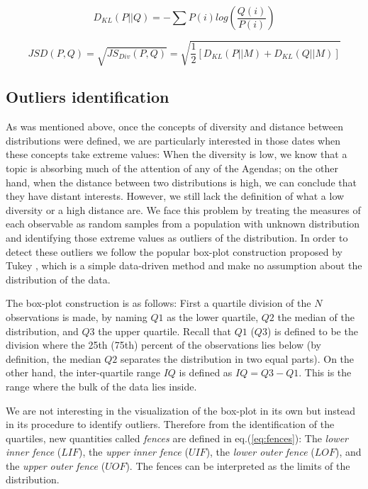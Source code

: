 \documentclass{bmcart}
\begin{document}
\begin{equation}
D_{KL}(P||Q) = -\sum{P(i) log(\frac{Q(i)}{P(i)})}
\label{eq:kl}
\end{equation}

\begin{equation}
\label{eq:jensen_shannon_distance}
JSD(P,Q) = \sqrt{JS_{Div}(P,Q)} = \sqrt{\frac{1}{2}[D_{KL}(P||M) + D_{KL}(Q||M)]} 
\label{eq:jensen_shannon_distance}
\end{equation}

\subsection*{Outliers identification}

\par As was mentioned above, once the concepts of diversity and distance between distributions were defined, we are particularly interested in those dates when these concepts take extreme values: When the diversity is low, we know that a topic is absorbing much of the attention of any of the Agendas; on the other hand, when the distance between two distributions is high, we can conclude that they have distant interests.
However, we still lack the definition of what a low diversity or a high distance are. 
We face this problem by treating the measures of each observable as random samples from a population with unknown distribution and identifying those extreme values as outliers of the distribution. 
In order to detect these outliers we follow the popular box-plot construction proposed by Tukey \cite{tukey1977exploratory}, which is a simple data-driven method and make no assumption about the distribution of the data.
\par The box-plot construction is as follows: First a quartile division of the $N$ observations is made, by naming $Q1$ as the lower quartile, $Q2$ the median of the distribution, and $Q3$ the upper quartile. Recall that $Q1$ ($Q3$) is defined to be the division where the 25th (75th) percent of the observations lies below (by definition, the median $Q2$ separates the distribution in two equal parts). On the other hand, the inter-quartile range $IQ$ is defined as $IQ = Q3 - Q1$. This is the range where the bulk of the data lies inside.
\par We are not interesting in the visualization of the box-plot in its own but instead in its procedure to identify outliers. Therefore from the identification of the quartiles, new quantities called \emph{fences} are defined in eq.(\ref{eq:fences}): The \emph{lower inner fence} ($LIF$), the \emph{upper inner fence} ($UIF$), the \emph{lower outer fence} ($LOF$), and the \emph{upper outer fence} ($UOF$). The fences can be interpreted as the limits of the distribution.
\end{document}
